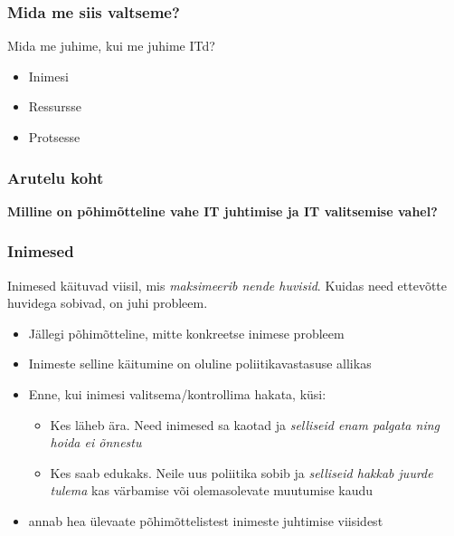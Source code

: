 \begin{frame}[fragile]
  \frametitle{Mida me siis valtseme?}
	Mida me juhime, kui me juhime ITd?
	\begin{itemize}
		\item Inimesi
		\item Ressursse
		\item Protsesse
	\end{itemize}
\end{frame}


\begin{frame}[fragile]
  \frametitle{Arutelu koht}
		\begin{center}
			\textbf{Milline on põhimõtteline vahe IT juhtimise ja IT valitsemise vahel?}
		\end{center}
\end{frame}

\begin{frame}[fragile]
  \frametitle{Inimesed}
  Inimesed käituvad viisil, mis \emph{maksimeerib nende huvisid}. Kuidas need ettevõtte huvidega sobivad, on juhi probleem.
	\begin{itemize}
		\item Jällegi põhimõtteline, mitte konkreetse inimese probleem
		\item Inimeste selline käitumine on oluline poliitikavastasuse allikas 
		\item Enne, kui inimesi valitsema/kontrollima hakata, küsi: 
			\begin{itemize}
				\item Kes läheb ära. Need inimesed sa kaotad ja \emph{selliseid enam palgata ning hoida ei õnnestu}
				\item Kes saab edukaks. Neile uus poliitika sobib ja \emph{selliseid hakkab juurde tulema} kas värbamise või olemasolevate muutumise kaudu
			\end{itemize}
		\item \cite{spolsky2008more} annab hea ülevaate põhimõttelistest inimeste juhtimise viisidest
	\end{itemize}
\end{frame}

